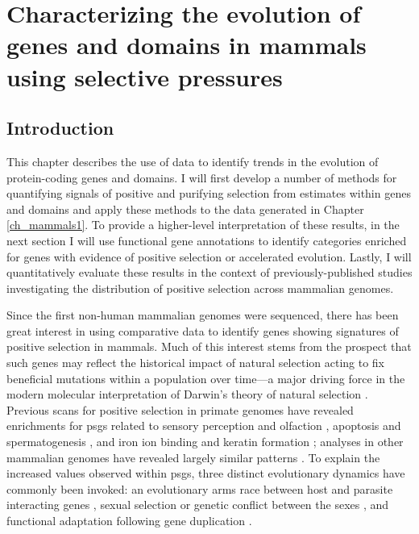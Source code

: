 \chapter{Characterizing the evolution of genes and domains in mammals using \sw selective pressures}
\section{Introduction}

This chapter describes the use of \sw data to identify trends in the
evolution of protein-coding genes and domains. I will first develop a
number of methods for quantifying signals of positive and purifying
selection from \sw estimates within genes and domains and apply these
methods to the \sw data generated in Chapter \ref{ch_mammals1}. To
provide a higher-level interpretation of these results, in the next
section I will use functional gene annotations to identify categories
enriched for genes with evidence of positive selection or accelerated
evolution. Lastly, I will quantitatively evaluate these results in the
context of previously-published studies investigating the distribution
of positive selection across mammalian genomes.

Since the first non-human mammalian genomes were sequenced, there has
been great interest in using comparative data to identify genes
showing signatures of positive selection in mammals. Much of this
interest stems from the prospect that such genes may reflect the
historical impact of natural selection acting to fix beneficial
mutations within a population over time---a major driving force in the
modern molecular interpretation of Darwin's theory of natural
selection \citep{Endo1996,Hughes1999}. Previous scans for positive
selection in primate genomes have revealed enrichments for \acp{psg}
related to sensory perception and olfaction \citep{Clark2003},
apoptosis and spermatogenesis \citep{Nielsen2005}, and iron ion
binding and keratin formation \citep{Macaque2007}; analyses in other
mammalian genomes have revealed largely similar patterns
\citep{Kosiol2008,Li2009a}. To explain the increased \dnds values
observed within \acp{psg}, three distinct evolutionary dynamics have
commonly been invoked: an evolutionary arms race between host and
parasite interacting genes \citep{Yang2005c}, sexual selection or
genetic conflict between the sexes \citep{Wyckoff2000,Clark2000}, and
functional adaptation following gene duplication \citep{Zhang2002}.

